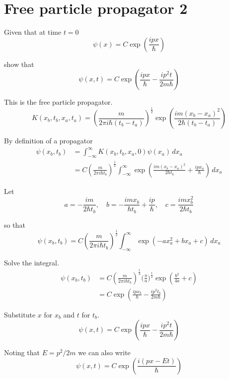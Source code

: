 


\section*{Free particle propagator 2}

Given that at time $t=0$
\begin{equation*}
\psi(x)=C\exp\left(\frac{ipx}{\hbar}\right)
\end{equation*}

show that
\begin{equation*}
\psi(x,t)=C\exp\left(\frac{ipx}{\hbar}-\frac{ip^2t}{2m\hbar}\right)
\end{equation*}

This is the free particle propagator.
\begin{equation*}
K(x_b,t_b,x_a,t_a)=\left(\frac{m}{2\pi i\hbar(t_b-t_a)}\right)^\frac{1}{2}
\exp\left(\frac{im(x_b-x_a)^2}{2\hbar(t_b-t_a)}\right)
\end{equation*}

By definition of a propagator
\begin{align*}
\psi(x_b,t_b)&=\int_{-\infty}^\infty K(x_b,t_b,x_a,0)\psi(x_a)\,dx_a
\\
&=C\left(\frac{m}{2\pi i\hbar t_b}\right)^\frac{1}{2}
\int_{-\infty}^\infty
\exp\left(\frac{im(x_b-x_a)^2}{2\hbar t_b}+\frac{ipx_a}{\hbar}\right)\,dx_a
\end{align*}

Let
\begin{equation*}
a=-\frac{im}{2\hbar t_b},\quad
b=-\frac{imx_b}{\hbar t_b}+\frac{ip}{\hbar},\quad
c=\frac{imx_b^2}{2\hbar t_b}
\end{equation*}

so that
\begin{equation*}
\psi(x_b,t_b)
=C\left(\frac{m}{2\pi i\hbar t_b}\right)^\frac{1}{2}
\int_{-\infty}^\infty
\exp(-ax_a^2+bx_a+c)\,dx_a
\tag{1}
\end{equation*}

Solve the integral.
\begin{align*}
\psi(x_b,t_b)&=C\left(\frac{m}{2\pi i\hbar t_b}\right)^\frac{1}{2}
\biggl(\frac{\pi}{a}\biggr)^\frac{1}{2}\exp\left(\frac{b^2}{4a}+c\right)
\\
&=C\exp\left(\frac{ipx_b}{\hbar}-\frac{ip^2t_b}{2m\hbar}\right)\tag{2}
\end{align*}

Substitute $x$ for $x_b$ and $t$ for $t_b$.
\begin{equation*}
\psi(x,t)=C\exp\left(\frac{ipx}{\hbar}-\frac{ip^2t}{2m\hbar}\right)
\end{equation*}

Noting that $E=p^2/2m$ we can also write
\begin{equation*}
\psi(x,t)=C\exp\left(\frac{i(px-Et)}{\hbar}\right)
\end{equation*}


